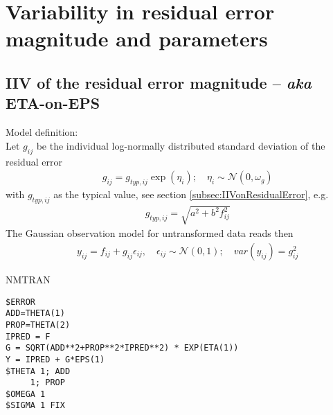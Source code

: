\section{Variability in residual error magnitude and parameters}
\label{otherModels_model1}

\subsection{IIV of the residual error magnitude -- \emph{aka} ETA-on-EPS}

Model definition:\\
Let $g_{ij}$ be the individual log-normally distributed standard deviation of the residual error
\begin{eqnarray}
&& g_{ij} = g_{typ,ij} \exp(\eta_i); \quad \eta_{i} \sim \mathcal{N}(0,\omega_g) \nonumber
\end{eqnarray}
with $g_{typ,ij}$ as the typical value, see section \ref{subsec:IIVonResidualError}, e.g.
\begin{eqnarray}
&& g_{typ,ij} = \sqrt{a^2 + b^2 f_{ij}^2} \nonumber
\end{eqnarray}
The Gaussian observation model for untransformed data reads then
\begin{eqnarray}
&& y_{ij} = f_{ij} + g_{ij} \epsilon_{ij}, \quad \epsilon_{ij} \sim \mathcal{N}(0,1); \quad var(y_{ij}) = g_{ij}^2	 \nonumber
\end{eqnarray}


\bigskip
\begin{lrbox}{\lstbox}\begin{minipage}{16cm}
NMTRAN
\begin{lstlisting}[frame=single,language=NM]
$ERROR
ADD=THETA(1)
PROP=THETA(2)
IPRED = F
G = SQRT(ADD**2+PROP**2*IPRED**2) * EXP(ETA(1))
Y = IPRED + G*EPS(1)
$THETA 1; ADD
	 1; PROP
$OMEGA 1
$SIGMA 1 FIX
\end{lstlisting}   
\end{minipage}\end{lrbox}
\usebox\lstbox


